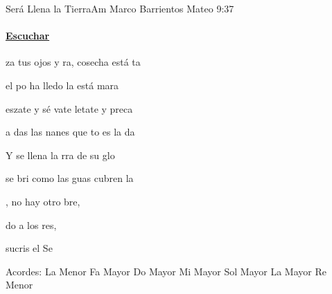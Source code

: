 \documentclass[12pt, spanish]{book}
\newcommand{\NotCCLIed}{\relax}
\begin{document}
    \begin{song}{Será Llena la Tierra}{Am}
    {} %
    {Marco Barrientos}
    {Mateo 9:37} %
    {} %
        \ifChordBk
        \paragraph{\mbox{}\hfill\protect\href{https://open.spotify.com/intl-es/track/6vjNRJjuK5jGw37lBglbCK}{Escuchar}\mbox{}\hfill}
        \fi


        \begin{SBOpGroup}
            za tus ojos y ra,  cosecha está ta

            el po ha lledo la  está mara

            eszate y sé vate letate y preca

            a das las nanes que to es la da
        \end{SBOpGroup}

        \begin{SBChorus}
            Y se llena la rra de su glo

            se bri como las guas cubren la 
        \end{SBChorus}

        \begin{SBOpGroup}
            , no hay otro bre,

            do a los res,

            sucris  el Se
        \end{SBOpGroup}

        \ifChordBk
        \begin{SBOpGroup}
            Acordes:
            \upchord{\Am}\qquad La Menor \hfill
            \upchord{\F}\qquad Fa Mayor \hfill\null\break
            \upchord{\C}\qquad Do Mayor \hfill
            \upchord{\E}\qquad Mi Mayor \hfill\null\break
            \upchord{\G}\qquad Sol Mayor \hfill
            \upchord{\A}\qquad La Mayor \hfill
            \upchord{\Dm}\qquad Re Menor \hfill
        \end{SBOpGroup}
        \fi
    \end{song}
\end{document}
